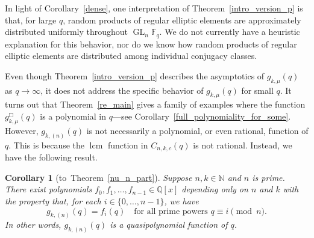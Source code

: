 \documentclass[10pt]{article}
\newtheorem{corollary}[theorem]{Corollary}
\theoremstyle{definition}
\DeclareMathOperator{\GL}{GL}
\DeclareMathOperator{\lcm}{lcm}
\newcommand{\F}{\mathbb{F}}
\newcommand{\N}{\mathbb{N}}
\newcommand{\Q}{\mathbb{Q}}
\begin{document}
In light of Corollary~\ref{dense}, one interpretation of Theorem~\ref{intro_version_p} is that, for large \(q\), random products of regular elliptic elements are approximately distributed uniformly throughout \(\GL_n \F_q\).
We do not currently have a heuristic explanation for this behavior, nor do we know how random products of regular elliptic elements are distributed among individual conjugacy classes.
















Even though Theorem~\ref{intro_version_p} describes the asymptotics of \(g_{k,\mu}(q)\) as \(q \to \infty\), it does not address the specific behavior of \(g_{k,\mu}(q)\) for small \(q\).
It turns out that Theorem~\ref{re_main} gives a family of examples where the function \(g_{k,\mu}^\Box (q)\) is a polynomial in \(q\)---see Corollary~\ref{full_polynomiality_for_some}.
However, \(g_{k,(n)} (q)\) is not necessarily a polynomial, or even rational, function of \(q\).
This is because the \(\lcm\) function in \(C_{n,k,c} (q)\) is not rational.
Instead, we have the following result.

\begin{corollary}[to~Theorem~\ref{nu_n_part}]
\label{polynomiality_for_nu_n}
Suppose \(n,k \in \N\) and \(n\) is prime.
There exist polynomials \(f_0, f_1, \ldots, f_{n-1} \in \Q[x]\) depending only on \(n\) and \(k\) with the property that, for each \(i \in \{0,\ldots,n-1\}\), we have
\begin{equation}
\label{its_a_quasipolynomial_yay}
g_{k,(n)}(q) = f_i(q) \quad \text{for all prime powers } q \equiv i \pmod n.
\end{equation}
In other words, \(g_{k,(n)} (q)\) is a quasipolynomial function of \(q\).
\end{corollary}
\end{document}
